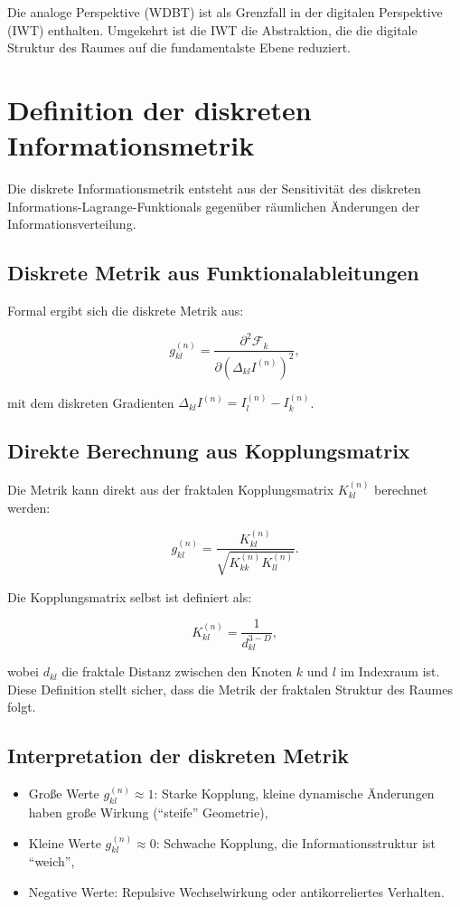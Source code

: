 Die analoge Perspektive (WDBT) ist als Grenzfall in der digitalen Perspektive (IWT) enthalten. Umgekehrt ist die IWT die Abstraktion, die die digitale Struktur des Raumes auf die fundamentalste Ebene reduziert.

\section{Definition der diskreten Informationsmetrik}
\label{sec:metrik_definition}

Die diskrete Informationsmetrik entsteht aus der Sensitivität des diskreten Informations-Lagrange-Funktionals gegenüber räumlichen Änderungen der Informationsverteilung.

\subsection{Diskrete Metrik aus Funktionalableitungen}
\label{sub:metrik_funktional}

Formal ergibt sich die diskrete Metrik aus:

\[
g_{kl}^{(n)} = \frac{\partial^2 \mathcal{F}_k}{\partial (\Delta_{kl} I^{(n)})^2},
\]

mit dem diskreten Gradienten \( \Delta_{kl} I^{(n)} = I_l^{(n)} - I_k^{(n)} \).

\subsection{Direkte Berechnung aus Kopplungsmatrix}
\label{sub:metrik_kopplung}

Die Metrik kann direkt aus der fraktalen Kopplungsmatrix \( K_{kl}^{(n)} \) berechnet werden:

\[
g_{kl}^{(n)} = \frac{K_{kl}^{(n)}}{\sqrt{K_{kk}^{(n)} K_{ll}^{(n)}}}.
\]

Die Kopplungsmatrix selbst ist definiert als:

\[
K_{kl}^{(n)} = \frac{1}{d_{kl}^{3-D}},
\]

wobei \( d_{kl} \) die fraktale Distanz zwischen den Knoten \( k \) und \( l \) im Indexraum ist. Diese Definition stellt sicher, dass die Metrik der fraktalen Struktur des Raumes folgt.

\subsection{Interpretation der diskreten Metrik}
\label{sub:metrik_interpretation}

\begin{itemize}
    \item Große Werte \( g_{kl}^{(n)} \approx 1 \): Starke Kopplung, kleine dynamische Änderungen haben große Wirkung (\enquote{steife} Geometrie),
    \item Kleine Werte \( g_{kl}^{(n)} \approx 0 \): Schwache Kopplung, die Informationsstruktur ist \enquote{weich},
    \item Negative Werte: Repulsive Wechselwirkung oder antikorreliertes Verhalten.
\end{itemize}

